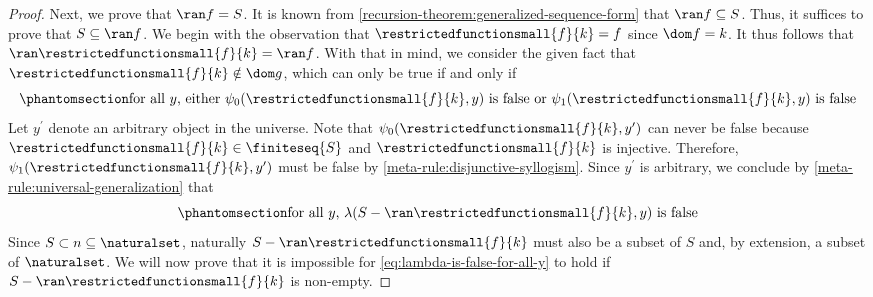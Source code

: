 \begin{proof}
    \vspace{0.3cm}
    \noindent
    Next, we prove that \( \ran f = S \).
    It is known from \cref{recursion-theorem:generalized-sequence-form} that \( \ran f \subseteq S \).
    Thus, it suffices to prove that \( S \subseteq \ran f \).
    We begin with the observation that \( \restrictedfunctionsmall{f}{k} = f \) since \( \dom f = k \).
    It thus follows that \( \ran \restrictedfunctionsmall{f}{k} = \ran f \).
    With that in mind, we consider the given fact that \( \restrictedfunctionsmall{f}{k} \notin \dom g \), which can only be true
    if and only if
    \begin{equation}
        \phantomsection \label{eq:either-psi-0-is-false-or-psi-1-is-false}
        \text{for all \( y \), either \( \psi_{0}( \restrictedfunctionsmall{f}{k}, y)\) is false or \( \psi_{1}( \restrictedfunctionsmall{f}{k}, y)\) is false}
    \end{equation}
    Let \( y^{\prime} \) denote an arbitrary object in the universe.
    Note that \( \psi_{0}( \restrictedfunctionsmall{f}{k}, y^{\prime})\) can never be false because \( \restrictedfunctionsmall{f}{k} \in \finiteseq{S} \) and
    \( \restrictedfunctionsmall{f}{k} \) is injective.
    Therefore, \( \psi_{1}( \restrictedfunctionsmall{f}{k}, y^{\prime})\) must be false by \cref{meta-rule:disjunctive-syllogism}.
    Since \( y^{\prime} \) is arbitrary, we conclude by \cref{meta-rule:universal-generalization} that
    \begin{equation}
        \phantomsection \label{eq:lambda-is-false-for-all-y}
        \text{for all \( y \), \( \lambda( S - \ran \restrictedfunctionsmall{f}{k}, y ) \) is false}
    \end{equation}
    Since \( S \subset n \subseteq \naturalset \), naturally \( S - \ran \restrictedfunctionsmall{f}{k} \) must also be a subset of \( S \) and, by extension,
    a subset of \( \naturalset \).
    We will now prove that it is impossible for \eqref{eq:lambda-is-false-for-all-y} to hold if \( S - \ran \restrictedfunctionsmall{f}{k} \) is non-empty.


\end{proof}
